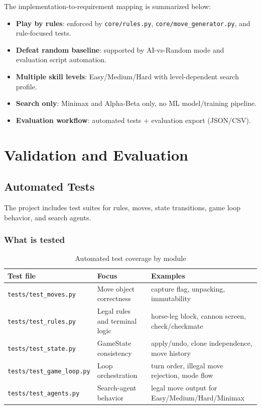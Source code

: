 \documentclass[a4paper,12pt]{article}
\newcommand{\sys}[1]{\nolinkurl{#1}}
\begin{document}
The implementation-to-requirement mapping is summarized below:
\begin{itemize}
  \item \textbf{Play by rules}: enforced by \texttt{core/rules.py}, \texttt{core/move\_generator.py}, and rule-focused tests.
  \item \textbf{Defeat random baseline}: supported by AI-vs-Random mode and evaluation script automation.
  \item \textbf{Multiple skill levels}: Easy/Medium/Hard with level-dependent search profile.
  \item \textbf{Search only}: Minimax and Alpha-Beta only, no ML model/training pipeline.
  \item \textbf{Evaluation workflow}: automated tests + evaluation export (JSON/CSV).
\end{itemize}


\section{Validation and Evaluation}

\subsection{Automated Tests}

The project includes test suites for rules, moves, state transitions, game loop behavior, and search agents.

\subsubsection{What is tested}

\begin{table}[H]
\centering
\caption{Automated test coverage by module}
\begin{tabularx}{\textwidth}{@{}p{}p{}X@{}}
\toprule
\textbf{Test file} & \textbf{Focus} & \textbf{Examples} \\\midrule
\sys{tests/test_moves.py} & Move object correctness & capture flag, unpacking, immutability \\
\sys{tests/test_rules.py} & Legal rules and terminal logic & horse-leg block, cannon screen, check/checkmate \\
\sys{tests/test_state.py} & GameState consistency & apply/undo, clone independence, move history \\
\sys{tests/test_game_loop.py} & Loop orchestration & turn order, illegal move rejection, mode flow \\
\sys{tests/test_agents.py} & Search-agent behavior & legal move output for Easy/Medium/Hard/Minimax \\\bottomrule
\end{tabularx}
\end{table}
\end{document}
